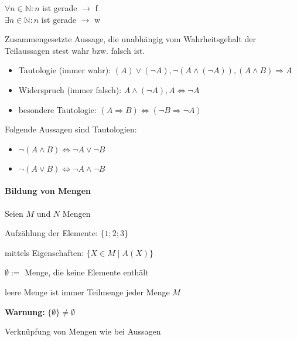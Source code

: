 \begin{exmpn}
	$\forall n \in \mathbb{N}: n$ ist gerade $\to$ f\\
	$\exists n \in \mathbb{N}: n$ ist gerade $\to$ w 
\end{exmpn}

\begin{mydef}
	Zusammengesetzte Aussage, die unabhängig vom Wahrheitsgehalt der Teilaussagen stest wahr bzw. falsch ist.
\end{mydef}

\newpage
\begin{exmpn}
	\begin{itemize}
		\item Tautologie (immer wahr): 
		$(A) \lor (\lnot A), \lnot (A  \land (\lnot A)), (A \land B) \Rightarrow A$
		\item Widerspruch (immer falsch): $A \land (\lnot A), A \iff \lnot A$  
		\item besondere Tautologie: $(A \Rightarrow B) \iff (\lnot B \Rightarrow \lnot A)$
	\end{itemize}
\end{exmpn}

\begin{satz}
	Folgende Aussagen sind Tautologien:
	\begin{itemize}{ }
		\item $\lnot(A \land B) \iff \lnot A \lor \lnot B$
		\item $\lnot(A \lor B) \iff \lnot A \land \lnot B$
	\end{itemize}
\end{satz}

\paragraph{Bildung von Mengen}
Seien $M$ und $N$ Mengen
\begin{compactitem}
	\item Aufzählung der Elemente: $\{1;2;3\}$
	\item mittels Eigenschaften: $\{X \in M \mid A(X)\}$
	\item $\emptyset:=$ Menge, die keine Elemente enthält
	\begin{compactitem}
		\item leere Menge ist immer Teilmenge jeder Menge $M$
		\item \textbf{Warnung:} $\{\emptyset\} \neq \emptyset$
	\end{compactitem}
	\item Verkn\"upfung von Mengen wie bei Aussagen
\end{compactitem}

